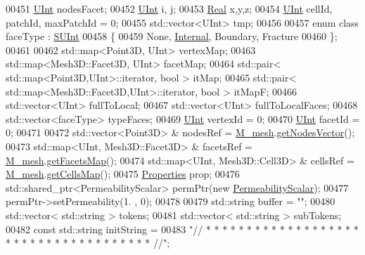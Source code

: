 \begin{DoxyCode}
00451     \hyperlink{namespaceFVCode3D_a4bf7e328c75d0fd504050d040ebe9eda}{UInt} nodesFacet;
00452     \hyperlink{namespaceFVCode3D_a4bf7e328c75d0fd504050d040ebe9eda}{UInt} i, j;
00453     \hyperlink{namespaceFVCode3D_a40c1f5588a248569d80aa5f867080e83}{Real} x,y,z;
00454     \hyperlink{namespaceFVCode3D_a4bf7e328c75d0fd504050d040ebe9eda}{UInt} cellId, patchId, maxPatchId = 0;
00455     std::vector<UInt> tmp;
00456 
00457     \textcolor{keyword}{enum class} faceType : \hyperlink{namespaceFVCode3D_a0319e74922d1d700fbc06e470e0cfc07}{SUInt}
00458     \{
00459         None, \hyperlink{namespaceFVCode3D_a604c2047b7f400e68b30a8132178c822a7d38403d00598d4bb163911f9aa48294}{Internal}, Boundary, Fracture
00460     \};
00461 
00462     std::map<Point3D, UInt> vertexMap;
00463     std::map<Mesh3D::Facet3D, UInt> facetMap;
00464     std::pair< std::map<Point3D,UInt>::iterator, \textcolor{keywordtype}{bool} > itMap;
00465     std::pair< std::map<Mesh3D::Facet3D,UInt>::iterator, \textcolor{keywordtype}{bool} > itMapF;
00466     std::vector<UInt> fullToLocal;
00467     std::vector<UInt> fullToLocalFaces;
00468     std::vector<faceType> typeFaces;
00469     \hyperlink{namespaceFVCode3D_a4bf7e328c75d0fd504050d040ebe9eda}{UInt} vertexId = 0;
00470     \hyperlink{namespaceFVCode3D_a4bf7e328c75d0fd504050d040ebe9eda}{UInt} facetId = 0;
00471 
00472     std::vector<Point3D> & nodesRef = \hyperlink{classFVCode3D_1_1Importer_a6f1542d6c6ac192e36c8eec7dc366653}{M\_mesh}.\hyperlink{classFVCode3D_1_1Mesh3D_a04162ec60e0fe52674b3ecbb7de1185c}{getNodesVector}();
00473     std::map<UInt, Mesh3D::Facet3D> & facetsRef = \hyperlink{classFVCode3D_1_1Importer_a6f1542d6c6ac192e36c8eec7dc366653}{M\_mesh}.\hyperlink{classFVCode3D_1_1Mesh3D_a76de387da2a552e3e1210d795bc7acf9}{getFacetsMap}();
00474     std::map<UInt, Mesh3D::Cell3D> & cellsRef = \hyperlink{classFVCode3D_1_1Importer_a6f1542d6c6ac192e36c8eec7dc366653}{M\_mesh}.\hyperlink{classFVCode3D_1_1Mesh3D_ad904ef5e068c89951d77e9364e960bf3}{getCellsMap}();
00475     \hyperlink{classFVCode3D_1_1Properties}{Properties} prop;
00476     std::shared\_ptr<PermeabilityScalar> permPtr(\textcolor{keyword}{new} \hyperlink{classFVCode3D_1_1PermeabilityScalar}{PermeabilityScalar});
00477     permPtr->setPermeability(1. , 0);
00478 
00479     std::string buffer = \textcolor{stringliteral}{""};
00480     std::vector< std::string > tokens;
00481     std::vector< std::string > subTokens;
00482     \textcolor{keyword}{const} std::string initString =
00483         \textcolor{stringliteral}{"// * * * * * * * * * * * * * * * * * * * * * * * * * * * * * * * * * * * * * //"};

\end{DoxyCode}
